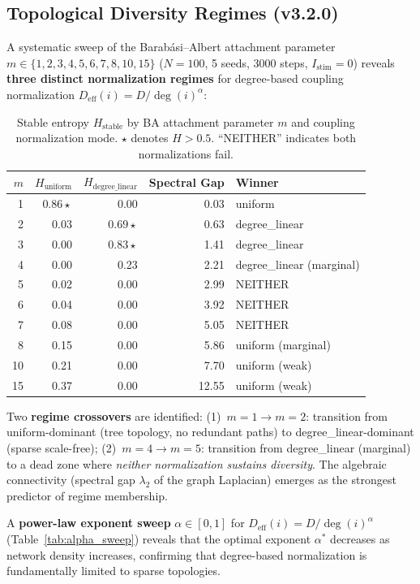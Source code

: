 \documentclass[11pt]{article}
\begin{document}
\subsection{Topological Diversity Regimes (v3.2.0)}
\label{sec:topo_regimes}

A systematic sweep of the Barab\'asi--Albert attachment parameter $m \in \{1, 2, 3, 4, 5, 6, 7, 8, 10, 15\}$ ($N=100$, 5 seeds, 3000 steps, $I_{\text{stim}}=0$) reveals \textbf{three distinct normalization regimes} for degree-based coupling normalization $D_{\text{eff}}(i) = D/\deg(i)^\alpha$:

\begin{table}[h]
\centering
\caption{Stable entropy $H_{\text{stable}}$ by BA attachment parameter $m$ and coupling normalization mode. $\star$ denotes $H > 0.5$. ``NEITHER'' indicates both normalizations fail.}
\label{tab:ba_m_sweep}
\begin{tabular}{rrrrl}
\toprule
$m$ & $H_{\text{uniform}}$ & $H_{\text{degree\_linear}}$ & Spectral Gap & Winner \\
\midrule
1  & $0.86 \star$ & 0.00 & 0.03 & uniform \\
2  & 0.03 & $0.69 \star$ & 0.63 & degree\_linear \\
3  & 0.00 & $0.83 \star$ & 1.41 & degree\_linear \\
4  & 0.00 & 0.23 & 2.21 & degree\_linear (marginal) \\
5  & 0.02 & 0.00 & 2.99 & NEITHER \\
6  & 0.04 & 0.00 & 3.92 & NEITHER \\
7  & 0.08 & 0.00 & 5.05 & NEITHER \\
8  & 0.15 & 0.00 & 5.86 & uniform (marginal) \\
10 & 0.21 & 0.00 & 7.70 & uniform (weak) \\
15 & 0.37 & 0.00 & 12.55 & uniform (weak) \\
\bottomrule
\end{tabular}
\end{table}

Two \textbf{regime crossovers} are identified: (1)~$m=1 \to m=2$: transition from uniform-dominant (tree topology, no redundant paths) to degree\_linear-dominant (sparse scale-free); (2)~$m=4 \to m=5$: transition from degree\_linear (marginal) to a dead zone where \emph{neither normalization sustains diversity}. The algebraic connectivity (spectral gap $\lambda_2$ of the graph Laplacian) emerges as the strongest predictor of regime membership.

A \textbf{power-law exponent sweep} $\alpha \in [0, 1]$ for $D_{\text{eff}}(i) = D/\deg(i)^\alpha$ (Table~\ref{tab:alpha_sweep}) reveals that the optimal exponent $\alpha^*$ decreases as network density increases, confirming that degree-based normalization is fundamentally limited to sparse topologies.
\end{document}

